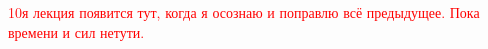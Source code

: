 \textcolor{red}{10я лекция появится тут, когда я осознаю и поправлю всё предыдущее. Пока времени и сил нетути.}